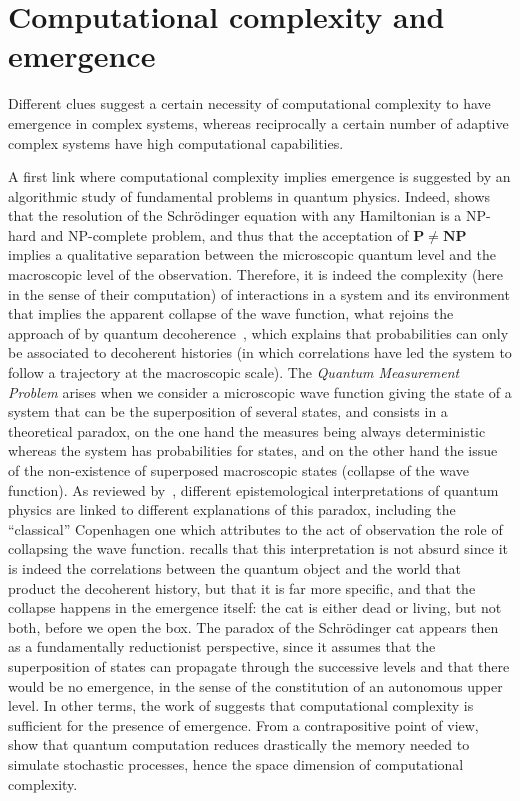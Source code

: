 \section{Computational complexity and emergence}

Different clues suggest a certain necessity of computational complexity to have emergence in complex systems, whereas reciprocally a certain number of adaptive complex systems have high computational capabilities.


A first link where computational complexity implies emergence is suggested by an algorithmic study of fundamental problems in quantum physics. Indeed, \cite{2014arXiv1403.7686B} shows that the resolution of the Schrödinger equation with any Hamiltonian is a NP-hard and NP-complete problem, and thus that the acceptation of $\mathbf{P}\neq\mathbf{NP}$ implies a qualitative separation between the microscopic quantum level and the macroscopic level of the observation. Therefore, it is indeed the complexity (here in the sense of their computation) of interactions in a system and its environment that implies the apparent collapse of the wave function, what rejoins the approach of  by quantum decoherence~\cite{gell1996quantum}, which explains that probabilities can only be associated to decoherent histories (in which correlations have led the system to follow a trajectory at the macroscopic scale). The \emph{Quantum Measurement Problem} arises when we consider a microscopic wave function giving the state of a system that can be the superposition of several states, and consists in a theoretical paradox, on the one hand the measures being always deterministic whereas the system has probabilities for states, and on the other hand the issue of the non-existence of superposed macroscopic states (collapse of the wave function). As reviewed by~\cite{schlosshauer2005decoherence}, different epistemological interpretations of quantum physics are linked to different explanations of this paradox, including the ``classical'' Copenhagen one which attributes to the act of observation the role of collapsing the wave function.  recalls that this interpretation is not absurd since it is indeed the correlations between the quantum object and the world that product the decoherent history, but that it is far more specific, and that the collapse happens in the emergence itself: the cat is either dead or living, but not both, before we open the box. The paradox of the Schrödinger cat appears then as a fundamentally reductionist perspective, since it assumes that the superposition of states can propagate through the successive levels and that there would be no emergence, in the sense of the constitution of an autonomous upper level. In other terms, the work of \cite{2014arXiv1403.7686B} suggests that computational complexity is sufficient for the presence of emergence. From a contrapositive point of view, \cite{2017arXiv170404231E} show that quantum computation reduces drastically the memory needed to simulate stochastic processes, hence the space dimension of computational complexity.


